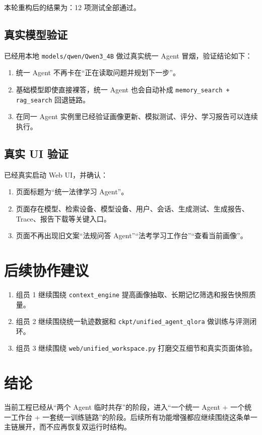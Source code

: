 \documentclass[12pt]{ctexart}
\begin{document}
本轮重构后的结果为：12 项测试全部通过。

\subsection{真实模型验证}

已经用本地 \texttt{models/qwen/Qwen3\_4B} 做过真实统一 Agent 冒烟，验证结论如下：

\begin{enumerate}
  \item 统一 Agent 不再卡在“正在读取问题并规划下一步”。
  \item 基础模型即使直接裸答，统一 Agent 也会自动补成 \texttt{memory\_search + rag\_search} 回退链路。
  \item 在同一 Agent 实例里已经验证画像更新、模拟测试、评分、学习报告可以连续执行。
\end{enumerate}

\subsection{真实 UI 验证}

已经真实启动 Web UI，并确认：

\begin{enumerate}
  \item 页面标题为“统一法律学习 Agent”。
  \item 页面存在模型、检索设备、模型设备、用户、会话、生成测试、生成报告、Trace、报告下载等关键入口。
  \item 页面不再出现旧文案“法规问答 Agent”“法考学习工作台”“查看当前画像”。
\end{enumerate}

\section{后续协作建议}

\begin{enumerate}
  \item 组员 1 继续围绕 \texttt{context\_engine} 提高画像抽取、长期记忆筛选和报告快照质量。
  \item 组员 2 继续围绕统一轨迹数据和 \texttt{ckpt/unified\_agent\_qlora} 做训练与评测闭环。
  \item 组员 3 继续围绕 \texttt{web/unified\_workspace.py} 打磨交互细节和真实页面体验。
\end{enumerate}

\section{结论}

当前工程已经从“两个 Agent 临时共存”的阶段，进入“一个统一 Agent + 一个统一工作台 + 一套统一训练链路”的阶段。后续所有功能增强都应继续围绕这条单一主链展开，而不应再恢复双运行时结构。
\end{document}
